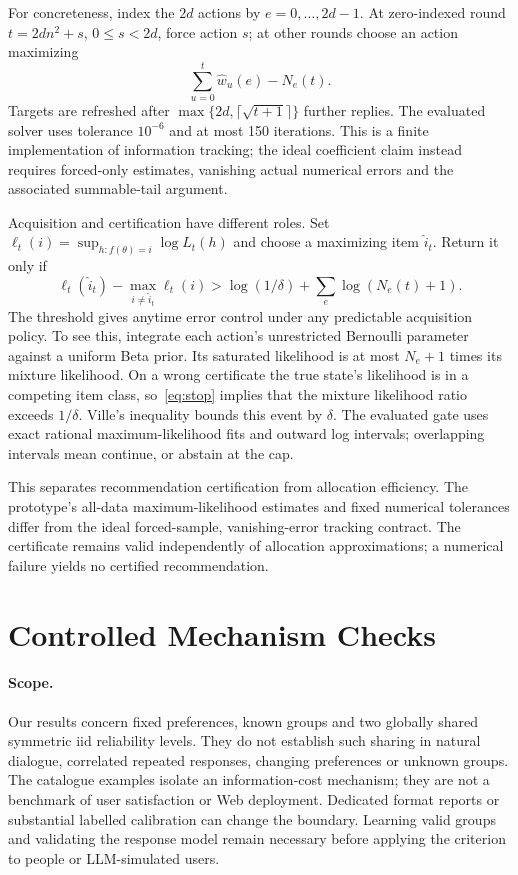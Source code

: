 \documentclass[sigconf,anonymous,review]{acmart}
\begin{document}
For concreteness, index the $2d$ actions by $e=0,\ldots,2d-1$. At zero-indexed round $t=2dn^2+s$, $0\le s<2d$, force action $s$; at other rounds choose an action maximizing
\[
 \sum_{u=0}^t\widehat w_u(e)-N_e(t).
\]
Targets are refreshed after $\max\{2d,\lceil\sqrt{t+1}\rceil\}$ further replies. The evaluated solver uses tolerance $10^{-6}$ and at most 150 iterations. This is a finite implementation of information tracking; the ideal coefficient claim instead requires forced-only estimates, vanishing actual numerical errors and the associated summable-tail argument.

Acquisition and certification have different roles. Set $\ell_t(i)=\sup_{h:f(\theta)=i}\log L_t(h)$ and choose a maximizing item $\widehat i_t$. Return it only if
\begin{equation}\label{eq:stop}
 \ell_t(\widehat i_t)-\max_{i\ne\widehat i_t}\ell_t(i)
 >\log(1/\delta)+\sum_e\log(N_e(t)+1).
\end{equation}
The threshold gives anytime error control under any predictable acquisition policy. To see this, integrate each action's unrestricted Bernoulli parameter against a uniform Beta prior. Its saturated likelihood is at most $N_e+1$ times its mixture likelihood. On a wrong certificate the true state's likelihood is in a competing item class, so~\eqref{eq:stop} implies that the mixture likelihood ratio exceeds $1/\delta$. Ville's inequality bounds this event by $\delta$. The evaluated gate uses exact rational maximum-likelihood fits and outward log intervals; overlapping intervals mean continue, or abstain at the cap.

This separates recommendation certification from allocation efficiency. The prototype's all-data maximum-likelihood estimates and fixed numerical tolerances differ from the ideal forced-sample, vanishing-error tracking contract. The certificate remains valid independently of allocation approximations; a numerical failure yields no certified recommendation.

\section{Controlled Mechanism Checks}


\paragraph{Scope.}
Our results concern fixed preferences, known groups and two globally shared symmetric iid reliability levels. They do not establish such sharing in natural dialogue, correlated repeated responses, changing preferences or unknown groups. The catalogue examples isolate an information-cost mechanism; they are not a benchmark of user satisfaction or Web deployment. Dedicated format reports or substantial labelled calibration can change the boundary. Learning valid groups and validating the response model remain necessary before applying the criterion to people or LLM-simulated users.
\end{document}
